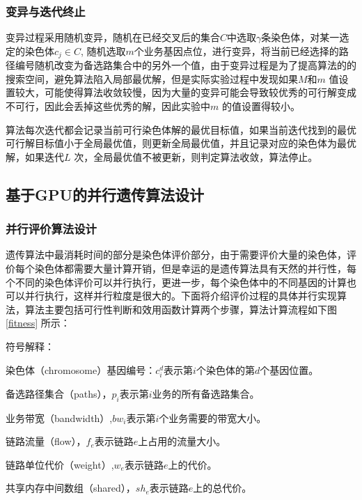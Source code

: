 \subsubsection{变异与迭代终止}
变异过程采用随机变异，随机在已经交叉后的集合$C$中选取$\gamma$条染色体，对某一选定的染色体$c_j \in C$, 随机选取$m$个业务基因点位，进行变异，将当前已经选择的路径编号随机改变为备选路集合中的另外一个值，由于变异过程是为了提高算法的的搜索空间，避免算法陷入局部最优解，但是实际实验过程中发现如果$M$和$m$ 值设置较大，可能使得算法收敛较慢，因为大量的变异可能会导致较优秀的可行解变成不可行，因此会丢掉这些优秀的解，因此实验中$m$ 的值设置得较小。

算法每次迭代都会记录当前可行染色体解的最优目标值，如果当前迭代找到的最优可行解目标值小于全局最优值，则更新全局最优值，并且记录对应的染色体为最优解，如果迭代$L$ 次，全局最优值不被更新，则判定算法收敛，算法停止。
\subsection{基于GPU的并行遗传算法设计}
\subsubsection{并行评价算法设计}
遗传算法中最消耗时间的部分是染色体评价部分，由于需要评价大量的染色体，评价每个染色体都需要大量计算开销，但是幸运的是遗传算法具有天然的并行性，每个不同的染色体评价可以并行执行，更进一步，每个染色体中的不同基因的计算也可以并行执行，这样并行粒度是很大的。下面将介绍评价过程的具体并行实现算法，算法主要包括可行性判断和效用函数计算两个步骤，算法计算流程如下图 \ref{fitness} 所示：

符号解释：

染色体（chromosome）基因编号：$c^d_i$表示第$i$个染色体的第$d$个基因位置。

备选路径集合（paths），$p_i$表示第$i$业务的所有备选路集合。

业务带宽（bandwidth）,$bw_i$表示第$i$个业务需要的带宽大小。

链路流量（flow），$f_e$表示链路$e$上占用的流量大小。

链路单位代价（weight）,$w_e$表示链路$e$上的代价。

共享内存中间数组（shared），$sh_e$表示链路$e$上的总代价。

